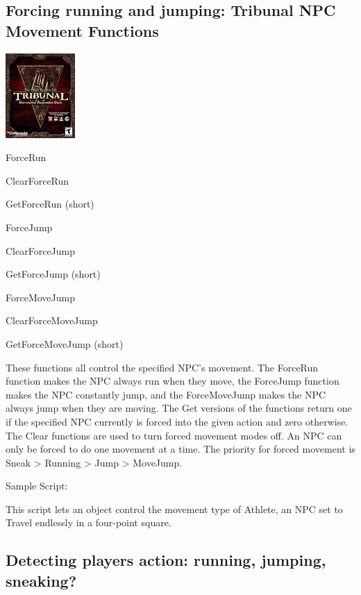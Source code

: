 \hypertarget{forcing-running-and-jumping-tribunal-npc-movement-functions}{%
\subsection{\texorpdfstring{\hfill\break
Forcing running and jumping: Tribunal NPC Movement
Functions}{ Forcing running and jumping: Tribunal NPC Movement Functions}}\label{forcing-running-and-jumping-tribunal-npc-movement-functions}}

\includegraphics{media/image6.png}

ForceRun

ClearForceRun

GetForceRun (short)

ForceJump

ClearForceJump

GetForceJump (short)

ForceMoveJump

ClearForceMoveJump

GetForceMoveJump (short)

These functions all control the specified NPC's movement. The ForceRun
function makes the NPC always run when they move, the ForceJump function
makes the NPC constantly jump, and the ForceMoveJump makes the NPC
always jump when they are moving. The Get versions of the functions
return one if the specified NPC currently is forced into the given
action and zero otherwise. The Clear functions are used to turn forced
movement modes off. An NPC can only be forced to do one movement at a
time. The priority for forced movement is Sneak \textgreater{} Running
\textgreater{} Jump \textgreater{} MoveJump.

Sample Script:

This script lets an object control the movement type of Athlete, an NPC
set to Travel endlessly in a four-point square.



\hypertarget{detecting-players-action-running-jumping-sneaking}{%
\subsection{Detecting players action: running, jumping,
sneaking?}\label{detecting-players-action-running-jumping-sneaking}}

